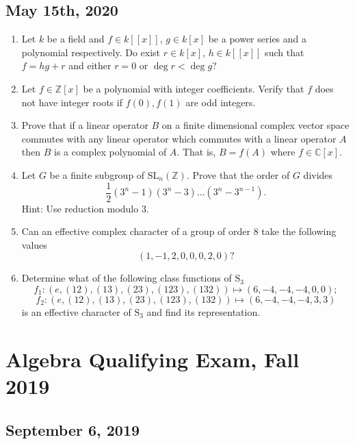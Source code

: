 \documentclass{article}
\begin{document}
\subsection*{May 15th, 2020}

\begin{enumerate}
    \item Let \(k\) be a field and \(f\in k[[x]]\), \(g\in k[x]\) be a power series and a polynomial respectively. Do exist \(r\in k[x]\), \(h\in k[[x]]\) such that \(f=hg+r\) and either \(r=0\) or \(\deg r<\deg g\)?

    \item Let \(f\in\mathbb{Z}[x]\) be a polynomial with integer coefficients. Verify that \(f\) does not have integer roots if \(f(0),f(1)\) are odd integers.

    \item Prove that if a linear operator \(B\) on a finite dimensional complex vector space commutes with any linear operator which commutes with a linear operator \(A\) then \(B\) is a complex polynomial of \(A\). That is, \(B=f(A)\) where \(f\in\mathbb{C}[x]\).

    \item Let \(G\) be a finite subgroup of \(\mathrm{SL}_{n}(\mathbb{Z})\). Prove that the order of \(G\) divides \[\frac{1}{2}(3^{n}-1)(3^{n}-3)\ldots(3^{n}-3^{n-1}).\] 
    Hint: Use reduction modulo 3.

    \item Can an effective complex character of a group of order 8 take the following values 
    \[(1,-1,2,0,0,0,2,0)?\]

    \item Determine what of the following class functions of \(\mathrm{S}_{3}\)
    \[f_{1}\colon(e,(12),(13),(23),(123),(132))\mapsto(6,-4,-4,-4,0,0);\]
    \[f_{2}\colon(e,(12),(13),(23),(123),(132))\mapsto(6,-4,-4,-4,3,3)\]
    is an effective character of \(\mathrm{S}_{3}\) and find its representation.
\end{enumerate}

\section*{Algebra Qualifying Exam, Fall 2019}
\subsection*{September 6, 2019}
\end{document}
